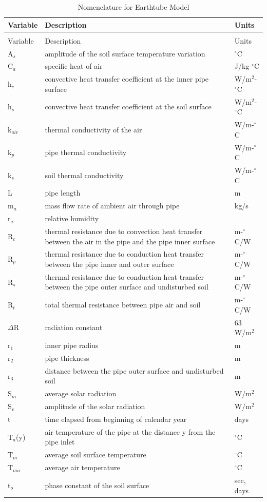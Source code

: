 \begin{longtable}[c]{p{1.5in}p{3.0in}p{1.5in}}
\caption{Nomenclature for Earthtube Model \label{table:nomenclature-for-earthtube-model}} \tabularnewline
\toprule
Variable & Description & Units \tabularnewline
\midrule
\endfirsthead

\caption[]{Nomenclature for Earthtube Model} \tabularnewline
\toprule
Variable & Description & Units \tabularnewline
\midrule
\endhead

A\(_{s}\) & amplitude of the soil surface temperature variation & \(^{\circ}\)C \tabularnewline
C\(_{a}\) & specific heat of air & J/kg-\(^{\circ}\)C \tabularnewline
h\(_{c}\) & convective heat transfer coefficient at the inner pipe surface & W/m\(^{2}\)-\(^{\circ}\)C \tabularnewline
h\(_{s}\) & convective heat transfer coefficient at the soil surface & W/m\(^{2}\)-\(^{\circ}\)C \tabularnewline
k\(_{air}\) & thermal conductivity of the air & W/m-\(^{\circ}\)C \tabularnewline
k\(_{p}\) & pipe thermal conductivity & W/m-\(^{\circ}\)C \tabularnewline
k\(_{s}\) & soil thermal conductivity & W/m-\(^{\circ}\)C \tabularnewline
L & pipe length & m \tabularnewline
m\(_{a}\) & mass flow rate of ambient air through pipe & kg/s \tabularnewline
r\(_{a}\) & relative humidity & ~ \tabularnewline
R\(_{c}\) & thermal resistance due to convection heat transfer between the air in the pipe and the pipe inner surface & m-\(^{\circ}\)C/W \tabularnewline
R\(_{p}\) & thermal resistance due to conduction heat transfer between the pipe inner and outer surface & m-\(^{\circ}\)C/W \tabularnewline
R\(_{s}\) & thermal resistance due to conduction heat transfer between the pipe outer surface and undisturbed soil & m-\(^{\circ}\)C/W \tabularnewline
R\(_{t}\) & total thermal resistance between pipe air and soil & m-\(^{\circ}\)C/W \tabularnewline
\({\Delta}\)R & radiation constant & 63 W/m\(^{2}\) \tabularnewline
r\(_{1}\) & inner pipe radius & m \tabularnewline
r\(_{2}\) & pipe thickness & m \tabularnewline
r\(_{3}\) & distance between the pipe outer surface and undisturbed soil & m \tabularnewline
S\(_{m}\) & average solar radiation & W/m\(^{2}\) \tabularnewline
S\(_{v}\) & amplitude of the solar radiation & W/m\(^{2}\) \tabularnewline
t & time elapsed from beginning of calendar year & days \tabularnewline
T\(_{a}\)(y) & air temperature of the pipe at the distance y from the pipe inlet & \(^{\circ}\)C \tabularnewline
T\(_{m}\) & average soil surface temperature & \(^{\circ}\)C \tabularnewline
T\(_{ma}\) & average air temperature & \(^{\circ}\)C \tabularnewline
t\(_{o}\) & phase constant of the soil surface & sec, days \tabularnewline

\end{longtable}
